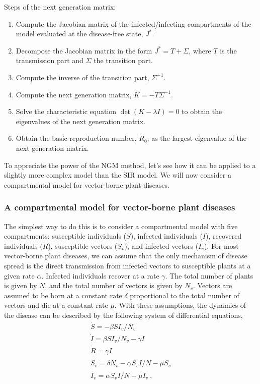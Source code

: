 \begin{theorem}
  \small\sffamily
  Steps of the next generation matrix:
  \begin{enumerate}
    \item Compute the Jacobian matrix of the infected/infecting compartments of
          the model evaluated at the disease-free state, $J^*$.
    \item Decompose the Jacobian matrix in the form $J^*=T+\Sigma$, where $T$
          is
          the transmission part and $\Sigma$ the transition part.
    \item Compute the inverse of the transition part, $\Sigma^{-1}$.
    \item Compute the next generation matrix, $K=-T\Sigma^{-1}$.
    \item Solve the characteristic equation $\det(K-\lambda I)=0$ to obtain the
          eigenvalues of the next generation matrix.
    \item Obtain the basic reproduction number, $R_0$, as the largest
          eigenvalue of the next generation matrix.
  \end{enumerate}
\end{theorem}

To appreciate the power of the NGM method, let's see how it can be applied to a
slightly more complex model than the SIR model. We will now consider a
compartmental model for vector-borne plant diseases.

\subsubsection*{A compartmental model for vector-borne plant diseases}

The simplest way to do this is to consider a compartmental model with five
compartments: susceptible individuals ($S$), infected individuals ($I$),
recovered individuals ($R$), susceptible vectors ($S_v$), and infected vectors
($I_v$). For most vector-borne plant diseases, we can assume that the only
mechanism of disease spread is the direct transmission from infected vectors to
susceptible plants at a given rate $\alpha$. Infected individuals recover at
a rate $\gamma$. The total number of plants is given by $N$, and the total
number of vectors is given by $N_v$. Vectors are assumed to be born at a
constant rate $\delta$ proportional to the total number of vectors and die at a
constant rate $\mu$. With these assumptions, the dynamics of the disease can be
described by the following system of differential equations,
\begin{equation}\label{eq: SIRV_model}
  \begin{array}{l}
    \dot{S}=-\beta SI_v/N_v                       \\
    \dot{I}=\beta SI_v/N_v -\gamma I              \\
    \dot{R}=\gamma I                              \\
    \dot{S_v}=\delta N_v -\alpha S_vI/N - \mu S_v \\
    \dot{I_v}=\alpha S_vI/N-\mu I_v \ ,
  \end{array}
\end{equation}

